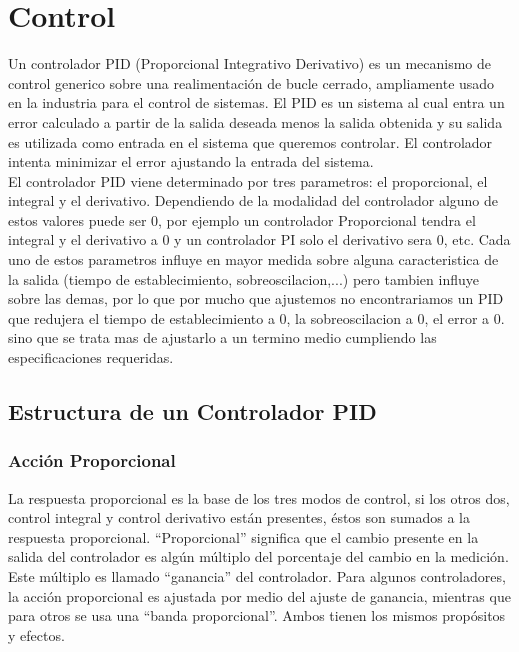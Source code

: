 \documentclass[a4paper,12pt,twoside]{proyectotanquesecci}
\begin{document}
\section{Control}

Un controlador PID (Proporcional Integrativo Derivativo) es un mecanismo de control generico sobre una realimentación de bucle cerrado, ampliamente usado en la industria para el control de sistemas. El PID es un sistema al cual entra un error calculado a partir de la salida deseada menos la salida obtenida y su salida es utilizada como entrada en el sistema que queremos controlar. El controlador intenta minimizar el error ajustando la entrada del sistema. \\

El controlador PID viene determinado por tres parametros: el proporcional, el integral y el derivativo. Dependiendo de la modalidad del controlador alguno de estos valores puede ser 0, por ejemplo un controlador Proporcional tendra el integral y el derivativo a 0 y un controlador PI solo el derivativo sera 0, etc. Cada uno de estos parametros influye en mayor medida sobre alguna caracteristica de la salida (tiempo de establecimiento, sobreoscilacion,...) pero tambien influye sobre las demas, por lo que por mucho que ajustemos no encontrariamos un PID que redujera el tiempo de establecimiento a 0, la sobreoscilacion a 0, el error a 0. sino que se trata mas de ajustarlo a un termino medio cumpliendo las especificaciones requeridas. \\

\subsection{Estructura de un Controlador PID}

\subsubsection*{Acción Proporcional}

La respuesta proporcional es la base de los tres modos de control, si los otros dos, control integral y control derivativo están presentes, éstos son sumados a la respuesta proporcional. “Proporcional” significa que el cambio presente en la salida del controlador es algún múltiplo del porcentaje del cambio en la medición.
Este múltiplo es llamado “ganancia” del controlador. Para algunos controladores, la acción proporcional es ajustada por medio del ajuste de ganancia, mientras que para otros se usa una “banda proporcional”. Ambos tienen los mismos propósitos y efectos. \\
\end{document}
